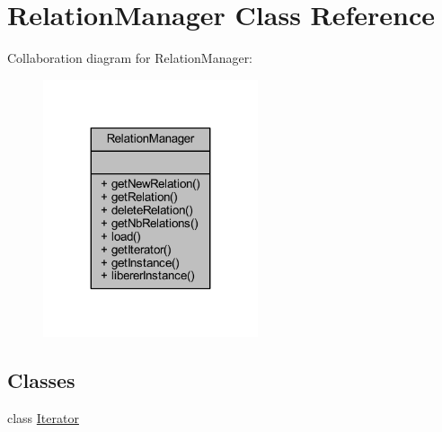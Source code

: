 \hypertarget{class_relation_manager}{}\section{Relation\+Manager Class Reference}
\label{class_relation_manager}


Collaboration diagram for Relation\+Manager\+:\nopagebreak
\begin{figure}[H]
\begin{center}
\leavevmode
\includegraphics[width=179pt]{class_relation_manager__coll__graph}
\end{center}
\end{figure}
\subsection*{Classes}
\begin{DoxyCompactItemize}
\item 
class \hyperlink{class_relation_manager_1_1_iterator}{Iterator}
\end{DoxyCompactItemize}
